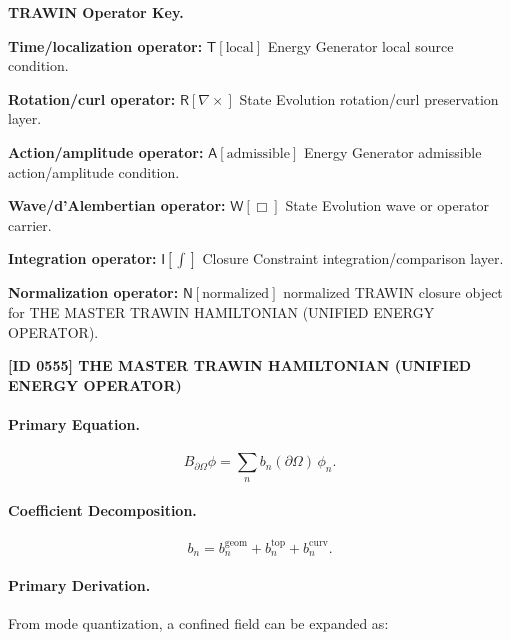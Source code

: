 \par\vspace{0.45\baselineskip}
\noindent\begin{minipage}[t]{\linewidth}
\begingroup
\small
\raggedright
\textbf{TRAWIN Operator Key.}\par
\noindent\textbf{Time/localization operator:} $\mathsf{T}\!\left[\mathrm{local}\right]$ Energy Generator local source condition.\par
\noindent\textbf{Rotation/curl operator:} $\mathsf{R}\!\left[\nabla\times\right]$ State Evolution rotation/curl preservation layer.\par
\noindent\textbf{Action/amplitude operator:} $\mathsf{A}\!\left[\mathrm{admissible}\right]$ Energy Generator admissible action/amplitude condition.\par
\noindent\textbf{Wave/d'Alembertian operator:} $\mathsf{W}\!\left[\Box\right]$ State Evolution wave or operator carrier.\par
\noindent\textbf{Integration operator:} $\mathsf{I}\!\left[\int\right]$ Closure Constraint integration/comparison layer.\par
\noindent\textbf{Normalization operator:} $\mathsf{N}\!\left[\mathrm{normalized}\right]$ normalized TRAWIN closure object for THE MASTER TRAWIN HAMILTONIAN (UNIFIED ENERGY OPERATOR).\par
\endgroup
\end{minipage}

\clearpage
\noindent\textbf{[ID 0555] THE MASTER TRAWIN HAMILTONIAN (UNIFIED ENERGY OPERATOR)}\par
\vspace{0.35em}
\paragraph{Primary Equation.}
\begin{equation}
B_{\partial\Omega}\phi
=
\sum_n b_n(\partial\Omega)\,\phi_n .
\end{equation}

\paragraph{Coefficient Decomposition.}
\begin{equation}
b_n
=
b_n^{\mathrm{geom}}
+
b_n^{\mathrm{top}}
+
b_n^{\mathrm{curv}} .
\end{equation}

\paragraph{Primary Derivation.}
From mode quantization, a confined field can be expanded as:


